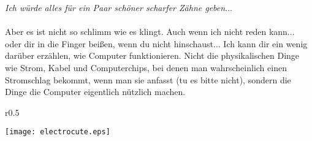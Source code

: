 \emph{Ich würde alles für ein Paar schöner scharfer Zähne geben$\ldots$}
\\
\\
Aber es ist nicht so schlimm wie es klingt. Auch wenn ich nicht reden kann... oder dir in die Finger beißen, wenn du nicht hinschaust... Ich kann dir ein wenig darüber erzählen, wie Computer funktionieren. Nicht die physikalischen Dinge wie Strom, Kabel und Computerchips, bei denen man wahrscheinlich einen Stromschlag bekommt, wenn man sie anfasst (tu es bitte nicht), sondern die Dinge die Computer eigentlich nützlich machen.

\begin{wrapfigure}{r}{0.5\textwidth}
  \begin{center}
\texttt{[image: electrocute.eps]}
  \end{center}
\end{wrapfigure}

